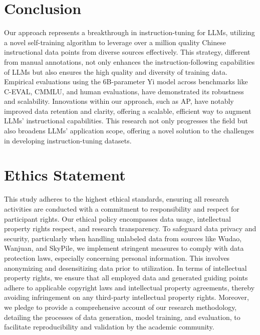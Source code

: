 \section{Conclusion}
Our approach represents a breakthrough in instruction-tuning for LLMs, utilizing a novel self-training algorithm to leverage over a million quality Chinese instructional data points from diverse sources effectively. 
This strategy, different from manual annotations, 
not only enhances the instruction-following capabilities of LLMs but also ensures the high quality and diversity of training data. 
Empirical evaluations using the 6B-parameter Yi model across benchmarks like C-EVAL, CMMLU, and human evaluations, have demonstrated its robustness and scalability. 
Innovations within our approach, such as AP, have notably improved data retention and clarity, offering a scalable, efficient way to augment LLMs' instructional capabilities. This research not only progresses the field but also broadens LLMs' application scope, offering a novel solution to the challenges in developing instruction-tuning datasets.

\section{Ethics Statement}
This study adheres to the highest ethical standards, ensuring all research activities are conducted with a commitment to responsibility and respect for participant rights. Our ethical policy encompasses data usage, intellectual property rights respect, and research transparency. To safeguard data privacy and security, particularly when handling unlabeled data from sources like Wudao, Wanjuan, and SkyPile, we implement stringent measures to comply with data protection laws, especially concerning personal information. This involves anonymizing and desensitizing data prior to utilization. In terms of intellectual property rights, we ensure that all employed data and generated guiding points adhere to applicable copyright laws and intellectual property agreements, thereby avoiding infringement on any third-party intellectual property rights. Moreover, we pledge to provide a comprehensive account of our research methodology, detailing the processes of data generation, model training, and evaluation, to facilitate reproducibility and validation by the academic community.

